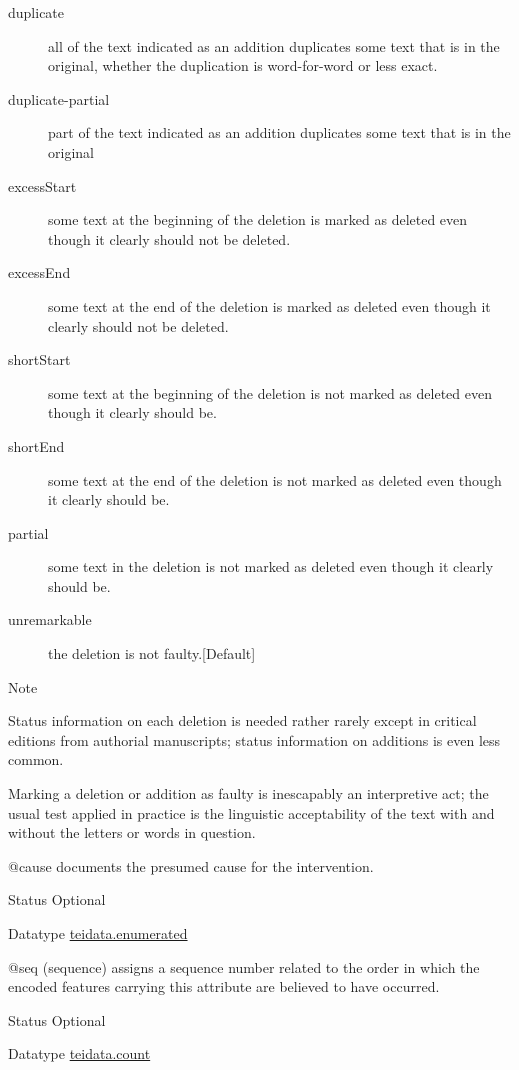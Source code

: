 \begin{reflist}
\begin{sansreflist}
\begin{reflist}
\begin{description}
\item[{duplicate}]all of the text indicated as an addition duplicates some text that is in the original, whether the duplication is word-for-word or less exact.
\item[{duplicate-partial}]part of the text indicated as an addition duplicates some text that is in the original
\item[{excessStart}]some text at the beginning of the deletion is marked as deleted even though it clearly should not be deleted.
\item[{excessEnd}]some text at the end of the deletion is marked as deleted even though it clearly should not be deleted.
\item[{shortStart}]some text at the beginning of the deletion is not marked as deleted even though it clearly should be.
\item[{shortEnd}]some text at the end of the deletion is not marked as deleted even though it clearly should be.
\item[{partial}]some text in the deletion is not marked as deleted even though it clearly should be.
\item[{unremarkable}]the deletion is not faulty.{[Default] }
\end{description} 
    \item[{Note}]
  \par
Status information on each deletion is needed rather rarely except in critical editions from authorial manuscripts; status information on additions is even less common.\par
Marking a deletion or addition as faulty is inescapably an interpretive act; the usual test applied in practice is the linguistic acceptability of the text with and without the letters or words in question.
\end{reflist}  
    \item[@cause]
  documents the presumed cause for the intervention.
\begin{reflist}
    \item[{Status}]
  Optional
    \item[{Datatype}]
  \hyperref[TEI.teidata.enumerated]{teidata.enumerated}
\end{reflist}  
    \item[@seq]
  (sequence) assigns a sequence number related to the order in which the encoded features carrying this attribute are believed to have occurred.
\begin{reflist}
    \item[{Status}]
  Optional
    \item[{Datatype}]
  \hyperref[TEI.teidata.count]{teidata.count}
\end{reflist}  
\end{sansreflist}  
\end{reflist}  
